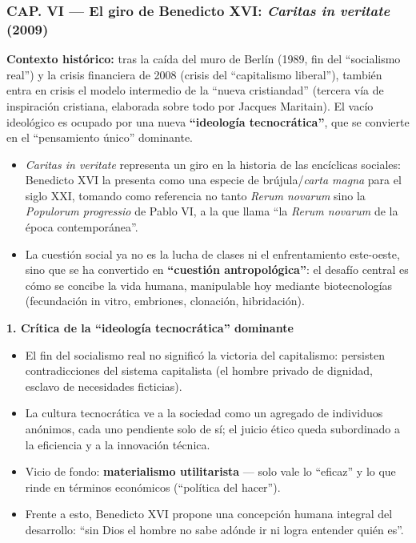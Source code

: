 \documentclass[10pt,a4paper]{article}
\begin{document}
\subsubsection{CAP. VI --- El giro de Benedicto XVI: \textit{Caritas in veritate} (2009)}

\noindent \textbf{Contexto histórico:} tras la caída del muro de Berlín (1989, fin del ``socialismo real'') y la crisis financiera de 2008 (crisis del ``capitalismo liberal''), también entra en crisis el modelo intermedio de la ``nueva cristiandad'' (tercera vía de inspiración cristiana, elaborada sobre todo por Jacques Maritain). El vacío ideológico es ocupado por una nueva \textbf{``ideología tecnocrática''}, que se convierte en el ``pensamiento único'' dominante.\par\smallskip

\begin{itemize}
\item \textit{Caritas in veritate} representa un giro en la historia de las encíclicas sociales: Benedicto XVI la presenta como una especie de brújula/\textit{carta magna} para el siglo XXI, tomando como referencia no tanto \textit{Rerum novarum} sino la \textit{Populorum progressio} de Pablo VI, a la que llama ``la \textit{Rerum novarum} de la época contemporánea''.
\item La cuestión social ya no es la lucha de clases ni el enfrentamiento este-oeste, sino que se ha convertido en \textbf{``cuestión antropológica''}: el desafío central es cómo se concibe la vida humana, manipulable hoy mediante biotecnologías (fecundación in vitro, embriones, clonación, hibridación).
\end{itemize}

\medskip\noindent \textbf{1. Crítica de la ``ideología tecnocrática'' dominante}\par\nopagebreak
\begin{itemize}
\item El fin del socialismo real no significó la victoria del capitalismo: persisten contradicciones del sistema capitalista (el hombre privado de dignidad, esclavo de necesidades ficticias).
\item La cultura tecnocrática ve a la sociedad como un agregado de individuos anónimos, cada uno pendiente solo de sí; el juicio ético queda subordinado a la eficiencia y a la innovación técnica.
\item Vicio de fondo: \textbf{materialismo utilitarista} --- solo vale lo ``eficaz'' y lo que rinde en términos económicos (``política del hacer'').
\item Frente a esto, Benedicto XVI propone una concepción humana integral del desarrollo: ``sin Dios el hombre no sabe adónde ir ni logra entender quién es''.
\end{itemize}
\end{document}
